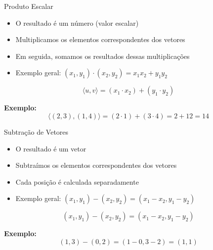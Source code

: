 \documentclass{beamer}
\begin{document}
\begin{frame}{Produto Escalar}


\vspace{0.5cm}

\begin{itemize}
    \item O resultado é um número (valor escalar)
    \item Multiplicamos os elementos correspondentes dos vetores
    \item Em seguida, somamos os resultados dessas multiplicações
    \item Exemplo geral: $(x_1, y_1) \cdot (x_2, y_2) = x_1 x_2 + y_1 y_2$
\end{itemize}

\vspace{0.5cm}

\[
\langle u, v \rangle = (x_1 \cdot x_2) + (y_1 \cdot y_2)
\]

\vspace{0.5cm}

\textbf{Exemplo:}
\[
\langle (2,3), (1,4) \rangle = (2 \cdot 1) + (3 \cdot 4) = 2 + 12 = 14
\]

\end{frame}
\begin{frame}{Subtração de Vetores}


\vspace{0.5cm}

\begin{itemize}
    \item O resultado é um vetor
    \item Subtraímos os elementos correspondentes dos vetores
    \item Cada posição é calculada separadamente
    \item Exemplo geral: $(x_1, y_1) - (x_2, y_2) = (x_1 - x_2, y_1 - y_2)$
\end{itemize}

\vspace{0.5cm}

\[
(x_1, y_1) - (x_2, y_2) = (x_1 - x_2, y_1 - y_2)
\]

\vspace{0.5cm}

\textbf{Exemplo:}
\[
(1,3) - (0,2) = (1-0, 3-2) = (1,1)
\]

\end{frame}
\end{document}
